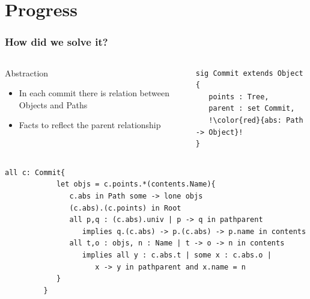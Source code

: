 \documentclass{beamer}
\begin{document}
\section{Progress}
\begin{frame}[fragile]
   \frametitle{How did we solve it?}
   \begin{columns}[c]
      \column{2.5in}
         \begin{block}{Abstraction}
            \begin{itemize}
               \item In each commit there is relation between Objects and Paths
               \item Facts to reflect the parent relationship
         \end{itemize}
         \end{block}
      \column{1.5in}\\


      \tiny
      \begin{lstlisting}[escapechar=!]
sig Commit extends Object {
   points : Tree,
   parent : set Commit,
   !\color{red}{abs: Path -> Object}!
}
     \end{lstlisting}
   \end{columns}
   \tiny
   \begin{lstlisting}[escapechar=!]
         all c: Commit{
            let objs = c.points.*(contents.Name){
               c.abs in Path some -> lone objs
               (c.abs).(c.points) in Root
               all p,q : (c.abs).univ | p -> q in pathparent 
                  implies q.(c.abs) -> p.(c.abs) -> p.name in contents
               all t,o : objs, n : Name | t -> o -> n in contents 
                  implies all y : c.abs.t | some x : c.abs.o | 
                     x -> y in pathparent and x.name = n
            }
         }
   \end{lstlisting}  
\end{frame}

\end{document}
